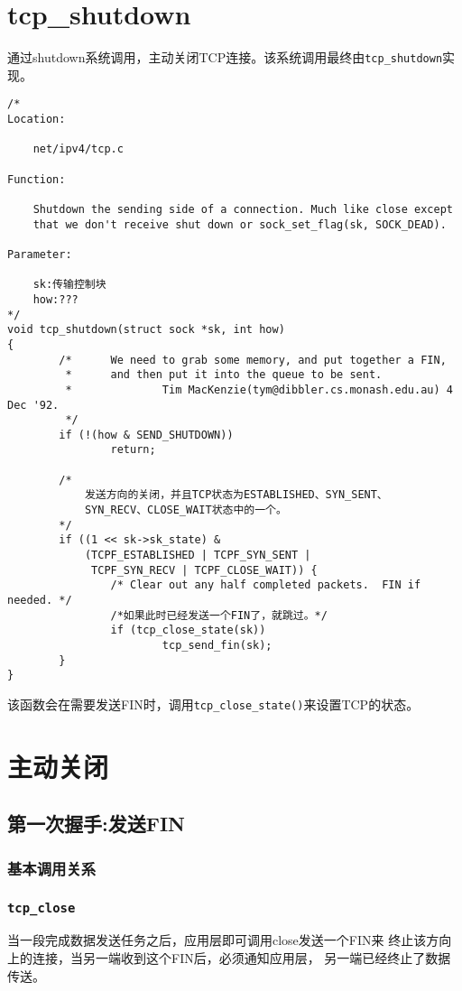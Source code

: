 \section{tcp\_shutdown}
			\label{ClientSendFin:tcp_shutdown}
			通过shutdown系统调用，主动关闭TCP连接。该系统调用最终由\texttt{tcp_shutdown}实现。
\begin{verbatim}
/*
Location:

	net/ipv4/tcp.c

Function:

	Shutdown the sending side of a connection. Much like close except
	that we don't receive shut down or sock_set_flag(sk, SOCK_DEAD).

Parameter:

	sk:传输控制块
	how:???
*/
void tcp_shutdown(struct sock *sk, int how)
{
        /*      We need to grab some memory, and put together a FIN,
         *      and then put it into the queue to be sent.
         *              Tim MacKenzie(tym@dibbler.cs.monash.edu.au) 4 Dec '92.
         */
        if (!(how & SEND_SHUTDOWN))
                return;

        /*
			发送方向的关闭，并且TCP状态为ESTABLISHED、SYN_SENT、
			SYN_RECV、CLOSE_WAIT状态中的一个。
		*/
        if ((1 << sk->sk_state) &
            (TCPF_ESTABLISHED | TCPF_SYN_SENT |
             TCPF_SYN_RECV | TCPF_CLOSE_WAIT)) {
                /* Clear out any half completed packets.  FIN if needed. */
				/*如果此时已经发送一个FIN了，就跳过。*/                
				if (tcp_close_state(sk))
                        tcp_send_fin(sk);
        }
}
\end{verbatim}
	
	该函数会在需要发送FIN时，调用\texttt{tcp_close_state()}来设置TCP的状态。

\section{主动关闭}
\label{Actively Close}

	\subsection{第一次握手:发送FIN}
		\subsubsection{基本调用关系}
		
		\subsubsection{\texttt{tcp_close}}
			当一段完成数据发送任务之后，应用层即可调用close发送一个FIN来
			终止该方向上的连接，当另一端收到这个FIN后，必须通知应用层，
			另一端已经终止了数据传送。

